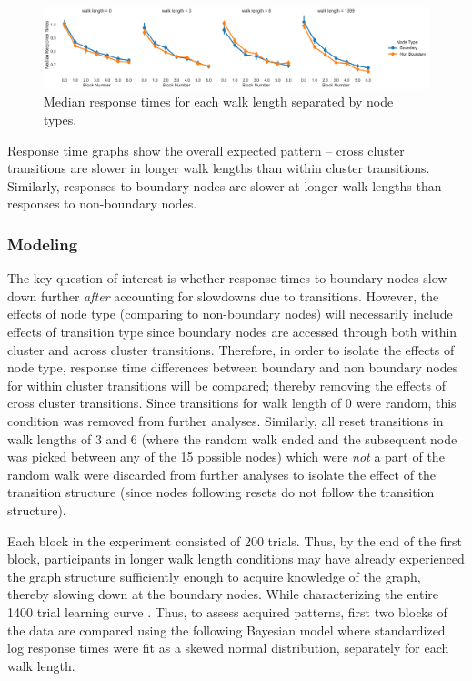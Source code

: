 \begin{figure}
	\centering
	\includegraphics[width = \textwidth]{chapter_notebooks/chapter_2/figures/median_rts_nodetype.png}
	\caption{Median response times for each walk length separated by node types.}
	\label{fig:rt-walklength-nodes}
\end{figure}

Response time graphs show the overall expected pattern -- cross cluster transitions are slower in longer walk lengths than within cluster transitions. Similarly, responses to boundary nodes are slower at longer walk lengths than responses to non-boundary nodes. 


\subsubsection*{Modeling}
The key question of interest is whether response times to boundary nodes slow down further \textit{after} accounting for slowdowns due to transitions. However, the effects of node type (comparing to non-boundary nodes) will necessarily include effects of transition type since boundary nodes are accessed through both within cluster and across cluster transitions. Therefore, in order to isolate the effects of node type, response time differences between boundary and non boundary nodes for within cluster transitions will be compared; thereby removing the effects of cross cluster transitions. Since transitions for walk length of 0 were random, this condition was removed from further analyses. Similarly, all reset transitions in walk lengths of 3 and 6 \ac{(where the random walk ended and the subsequent node was picked between any of the 15 possible nodes)} which were \textit{not} a part of the random walk were discarded from further analyses \ac{to isolate the effect of the transition structure (since nodes following resets do not follow the transition structure)}. 

Each block in the experiment consisted of 200 trials. Thus, by the end of the first block, participants in longer walk length conditions may have already experienced the graph structure sufficiently enough to acquire knowledge of the graph, thereby slowing down at the boundary nodes. While characterizing the entire 1400 trial learning curve . Thus, to assess acquired patterns, first two blocks of the data are compared using the following Bayesian model where standardized log response times were fit as a skewed normal distribution, separately for each walk length.

